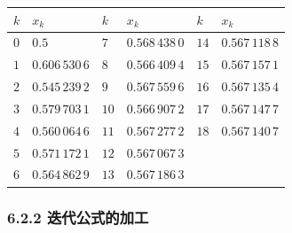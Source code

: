 {\def\LTcaptype{none} %
\begin{longtable}[]{@{}
  >{\raggedright\arraybackslash}p{}
  >{\raggedright\arraybackslash}p{}
  >{\raggedright\arraybackslash}p{}
  >{\raggedright\arraybackslash}p{}
  >{\raggedright\arraybackslash}p{}
  >{\raggedright\arraybackslash}p{}@{}}
\toprule\noalign{}
\begin{minipage}[b]{\linewidth}\raggedright
\(k\)
\end{minipage} & \begin{minipage}[b]{\linewidth}\raggedright
\(x_k\)
\end{minipage} & \begin{minipage}[b]{\linewidth}\raggedright
\(k\)
\end{minipage} & \begin{minipage}[b]{\linewidth}\raggedright
\(x_k\)
\end{minipage} & \begin{minipage}[b]{\linewidth}\raggedright
\(k\)
\end{minipage} & \begin{minipage}[b]{\linewidth}\raggedright
\(x_k\)
\end{minipage} \\
\midrule\noalign{}
\endhead
\bottomrule\noalign{}
\endlastfoot
\(0\) & \(0.5\) & \(7\) & \(0.568\,438\,0\) & \(14\) & \(0.567\,118\,8\) \\
\(1\) & \(0.606\,530\,6\) & \(8\) & \(0.566\,409\,4\) & \(15\) & \(0.567\,157\,1\) \\
\(2\) & \(0.545\,239\,2\) & \(9\) & \(0.567\,559\,6\) & \(16\) & \(0.567\,135\,4\) \\
\(3\) & \(0.579\,703\,1\) & \(10\) & \(0.566\,907\,2\) & \(17\) & \(0.567\,147\,7\) \\
\(4\) & \(0.560\,064\,6\) & \(11\) & \(0.567\,277\,2\) & \(18\) & \(0.567\,140\,7\) \\
\(5\) & \(0.571\,172\,1\) & \(12\) & \(0.567\,067\,3\) & & \\
\(6\) & \(0.564\,862\,9\) & \(13\) & \(0.567\,186\,3\) & & \\
\end{longtable}
}

\subsubsection{6.2.2 迭代公式的加工}\label{ch06-ux8fedux4ee3ux516cux5f0fux7684ux52a0ux5de5}

